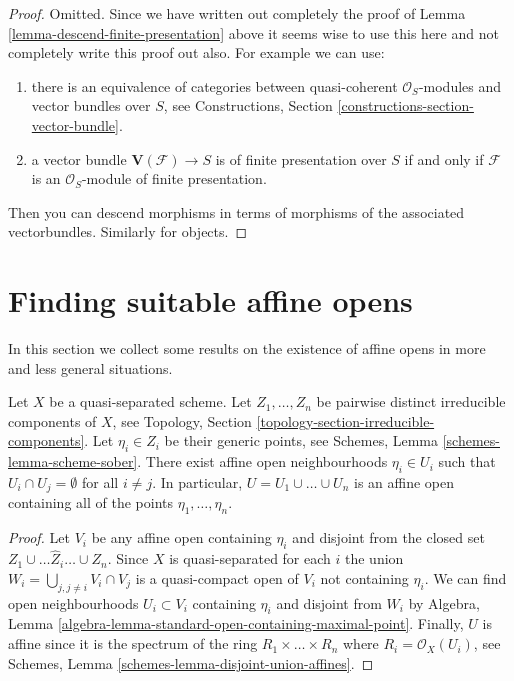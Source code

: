\begin{proof}
Omitted. Since we have written out completely the proof of
Lemma \ref{lemma-descend-finite-presentation} above
it seems wise to use this here and not completely write this
proof out also. For example we can use:
\begin{enumerate}
\item there is an equivalence of categories
between quasi-coherent $\mathcal{O}_S$-modules and
vector bundles over $S$, see
Constructions, Section \ref{constructions-section-vector-bundle}.
\item a vector bundle $\mathbf{V}(\mathcal{F}) \to S$ is 
of finite presentation over $S$ if and only if $\mathcal{F}$
is an $\mathcal{O}_S$-module of finite presentation.
\end{enumerate}
Then you can descend morphisms in terms of morphisms of the
associated vectorbundles. Similarly for objects.
\end{proof}















\section{Finding suitable affine opens}
\label{section-finding-affine-opens}

\noindent
In this section we collect some results on the existence of
affine opens in more and less general situations.

\begin{lemma}
\label{lemma-maximal-points-affine}
Let $X$ be a quasi-separated scheme.
Let $Z_1, \ldots, Z_n$ be pairwise distinct irreducible components of $X$,
see Topology, Section \ref{topology-section-irreducible-components}.
Let $\eta_i \in Z_i$ be their generic points, see
Schemes, Lemma \ref{schemes-lemma-scheme-sober}.
There exist affine open neighbourhoods $\eta_i \in U_i$
such that $U_i \cap U_j = \emptyset$ for all $i \not = j$.
In particular, $U = U_1 \cup \ldots \cup U_n$ is an affine
open containing all of the points $\eta_1, \ldots, \eta_n$.
\end{lemma}

\begin{proof}
Let $V_i$ be any affine open containing $\eta_i$
and disjoint from the closed set $Z_1 \cup \ldots \hat Z_i \ldots \cup Z_n$.
Since $X$ is quasi-separated for each $i$ the union
$W_i = \bigcup_{j, j \not = i} V_i \cap V_j$ is a quasi-compact
open of $V_i$ not containing $\eta_i$. 
We can find open neighbourhoods $U_i \subset V_i$
containing $\eta_i$ and disjoint from $W_i$ by
Algebra, Lemma \ref{algebra-lemma-standard-open-containing-maximal-point}.
Finally, $U$ is affine since it is the spectrum of
the ring $R_1 \times \ldots \times R_n$ where $R_i = \mathcal{O}_X(U_i)$,
see Schemes, Lemma \ref{schemes-lemma-disjoint-union-affines}.
\end{proof}

